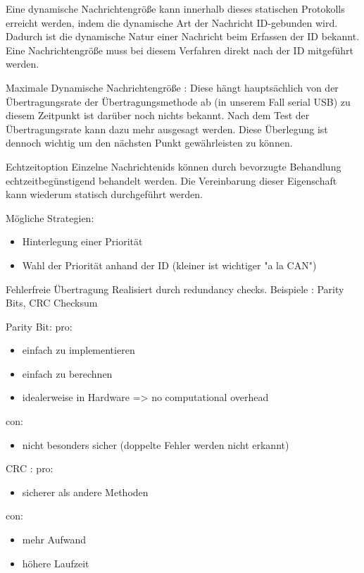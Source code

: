 Eine dynamische Nachrichtengröße kann innerhalb dieses statischen Protokolls erreicht werden, indem die dynamische Art der Nachricht ID-gebunden wird. Dadurch ist die dynamische Natur einer Nachricht beim Erfassen der ID bekannt. Eine Nachrichtengröße muss bei diesem Verfahren direkt nach der ID mitgeführt werden.

Maximale Dynamische Nachrichtengröße : Diese hängt hauptsächlich von der Übertragungsrate der Übertragungsmethode ab (in unserem Fall serial USB) zu diesem Zeitpunkt ist darüber noch nichts bekannt. Nach dem Test der Übertragungsrate kann dazu mehr ausgesagt werden. Diese Überlegung ist dennoch wichtig um den nächsten Punkt gewährleisten zu können.

\Large Echtzeitoption
\normalsize
Einzelne Nachrichtenids können durch bevorzugte Behandlung echtzeitbegünstigend behandelt werden. Die Vereinbarung dieser Eigenschaft kann wiederum statisch durchgeführt werden.

Mögliche Strategien:
\begin{itemize}
	\item Hinterlegung einer Priorität
	\item Wahl der Priorität anhand der ID (kleiner ist wichtiger "a la CAN")
\end{itemize}

\Large Fehlerfreie Übertragung
\normalsize
Realisiert durch redundancy checks. Beispiele : Parity Bits, CRC Checksum

Parity Bit:
pro:
\begin{itemize}
	\item einfach zu implementieren
	\item einfach zu berechnen
	\item idealerweise in Hardware => no computational overhead
\end{itemize}
con:
\begin{itemize}
	\item nicht besonders sicher (doppelte Fehler werden nicht erkannt)
\end{itemize}

CRC :
pro:
\begin{itemize}
	\item sicherer als andere Methoden
\end{itemize}
con:
\begin{itemize}
	unter Umständen ist zur Realisierung mehr Code nötig, woraus folgt
	\item mehr Aufwand
	\item höhere Laufzeit
\end{itemize}

